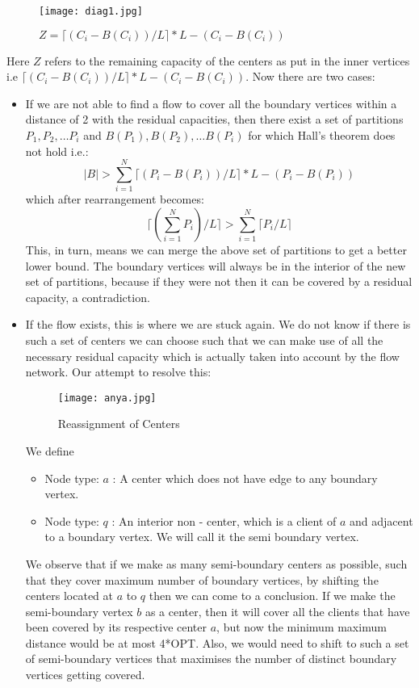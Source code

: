 \documentclass[12pt,a4paper,onecolumn]{article}
\begin{document}
\begin{center}
\begin{figure}[H]
\texttt{[image: diag1.jpg]}
\caption{$Z=\lceil (C_i-B(C_i))/L\rceil*L-(C_i-B(C_i))$}
\end{figure}
\end{center}
Here $Z$ refers to the remaining capacity of the centers as put in the inner vertices i.e $\lceil (C_i-B(C_i))/L\rceil*L-(C_i-B(C_i))$.
Now there are two cases:
\begin{itemize}
\item If we are not able to find a flow to cover all the boundary vertices within a distance of 2 with the residual capacities, then there exist a set of partitions $P_1, P_2,\ldots P_i$ and $B(P_1), B(P_2),\ldots B(P_i)$ for which Hall’s theorem does not hold i.e.: 
 $$|B|> {\sum_{i=1}^{N}\lceil (P_i-B(P_i))/L\rceil*L-(P_i-B(P_i))}$$
which after rearrangement becomes:\\
$$\lceil (\sum_{i=1}^{N}P_i)/L \rceil > \sum_{i=1}^{N} \lceil P_i/L \rceil   $$
This, in turn, means we can merge the above set of partitions to get a better lower bound. The boundary vertices will always be in the interior of the new set of partitions, because if they were not then it can be covered by a residual capacity, a contradiction.



\item If the flow exists, this is where we are stuck again. We do not know if there is such a set of centers we can choose such that we can make use of all the necessary residual capacity which is actually taken into account by the flow network. 
Our attempt to resolve this:

\begin{flushleft}
\begin{figure}[H]
\texttt{[image: anya.jpg]}
  
  \caption{Reassignment of Centers}
\end{figure}
\end{flushleft}

We define
\begin{itemize}


\item Node type: $a$ : A center which does not have edge to any boundary vertex.
\item Node type: $q$ : An interior non - center, which is a client of $a$ and adjacent to a boundary vertex. We will call it the semi boundary vertex. 
\end{itemize} 
We observe that if we make as many semi-boundary centers as possible, such that they cover maximum number of boundary vertices, by shifting the centers located at $a$ to $q$ then we can come to a conclusion. 
If we make the semi-boundary vertex $b$ as a center, then it will cover all the clients that have been covered by its respective center $a$, but now the minimum maximum distance would be at most 4*OPT. Also, we would need to shift to such a set of semi-boundary vertices that maximises the number of distinct boundary vertices getting covered. 


\end{itemize}
\end{document}
